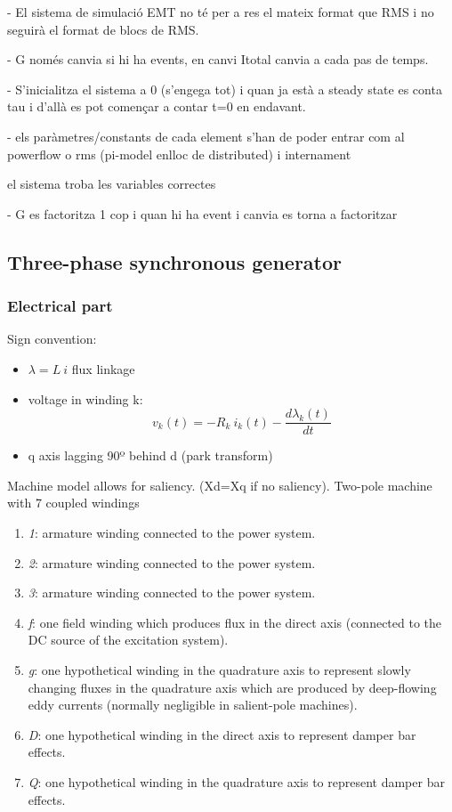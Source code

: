 - El sistema de simulació EMT no té per a res el mateix format que RMS i no seguirà el format de blocs de RMS.

- G només canvia si hi ha events, en canvi Itotal canvia a cada pas de temps.

- S'inicialitza el sistema a 0 (s'engega tot) i quan ja està a steady state es conta tau i d'allà es pot començar a contar t=0 en endavant.

- els paràmetres/constants de cada element s'han de poder entrar com al powerflow o rms (pi-model enlloc de distributed) i internament

el sistema troba les variables correctes


- G es factoritza 1 cop i quan hi ha event i canvia es torna a factoritzar

\subsection{Three-phase synchronous generator}
\subsubsection{Electrical part}
Sign convention:
\begin{itemize}
    \item $\lambda = L~i$ flux linkage 
    \item  voltage in winding k:
    \begin{equation}
        v_k(t) = -R_k~i_k(t) - \frac{d \lambda_k(t)}{d t} 
        \label{eq:winding_eq}
    \end{equation}
    \item q axis lagging 90º behind d (park transform)
\end{itemize}

Machine model allows for saliency. (Xd=Xq if no saliency). Two-pole machine with 7 coupled windings

\begin{enumerate}
    \item \textit{1}: armature winding connected to the power system.
    \item \textit{2}: armature winding connected to the power system.
    \item \textit{3}: armature winding connected to the power system.
    \item \textit{f}: one field winding which produces flux in the direct axis (connected to the DC source of the excitation system).
    \item \textit{g}: one hypothetical winding in the quadrature axis to represent slowly changing fluxes in the quadrature axis which are produced by deep-flowing eddy currents
    (normally negligible in salient-pole machines).
    \item \textit{D}: one hypothetical winding in the direct axis to represent damper bar effects.
    \item \textit{Q}: one hypothetical winding in the quadrature axis to represent damper bar effects.
\end{enumerate}

